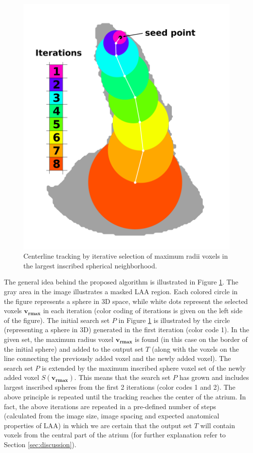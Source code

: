 \documentclass[review]{elsarticle}
\begin{document}
\begin{figure}[t]
  \centering
  \includegraphics[width=0.4\linewidth]{fig2.png}
  \caption{Centerline tracking by iterative selection of maximum radii voxels in the largest inscribed spherical neighborhood.}
  \label{fig:spheres}  
\end{figure}

The general idea behind the proposed algorithm is illustrated in Figure
\ref{fig:spheres}. The gray area in the image illustrates a masked LAA region.
Each colored circle in the figure represents a sphere in 3D space, while white
dots represent the selected voxels $\mathbf{v_{rmax}}$ in each iteration (color
coding of iterations is given on the left side of the figure).  The initial
search set $P$ in Figure \ref{fig:spheres} is illustrated by the circle
(representing a sphere in 3D) generated in the first iteration (color code 1).
In the given set, the maximum radius voxel $\mathbf{v_{rmax}}$ is found (in
this case on the border of the initial sphere) and added to the output set $T$
(along with the voxels on the line connecting the previously added voxel and
the newly added voxel). The search set $P$ is extended by the maximum inscribed
sphere voxel set of the newly added voxel $S(\mathbf{v_{rmax}})$. This means
that the search set $P$ has grown and includes largest inscribed spheres from
the first 2 iterations (color codes 1 and 2). The above principle is repeated
until the tracking reaches the center of the atrium. In fact, the above
iterations are repeated in a pre-defined number of steps (calculated from the
image size, image spacing and expected anatomical properties of LAA) in which
we are certain that the output set $T$ will contain voxels from the central
part of the atrium (for further explanation refer to Section
\ref{sec:discussion}).
\end{document}
